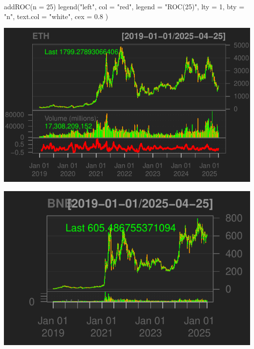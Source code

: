 \documentclass[]{tufte-handout}
\newenvironment{Shaded}{}{}
\newcommand{\AttributeTok}[1]{\textcolor[rgb]{0.49,0.56,0.16}{#1}}
\newcommand{\DecValTok}[1]{\textcolor[rgb]{0.25,0.63,0.44}{#1}}
\newcommand{\FloatTok}[1]{\textcolor[rgb]{0.25,0.63,0.44}{#1}}
\newcommand{\FunctionTok}[1]{\textcolor[rgb]{0.02,0.16,0.49}{#1}}
\newcommand{\NormalTok}[1]{#1}
\newcommand{\OtherTok}[1]{\textcolor[rgb]{0.00,0.44,0.13}{#1}}
\newcommand{\SpecialCharTok}[1]{\textcolor[rgb]{0.25,0.44,0.63}{#1}}
\newcommand{\StringTok}[1]{\textcolor[rgb]{0.25,0.44,0.63}{#1}}
\begin{document}
\begin{Shaded}
\begin{Highlighting}[]
\FunctionTok{addROC}\NormalTok{(}\AttributeTok{n =} \DecValTok{25}\NormalTok{)}
\FunctionTok{legend}\NormalTok{(}\StringTok{"left"}\NormalTok{,}
  \AttributeTok{col =} \StringTok{"red"}\NormalTok{, }\AttributeTok{legend =} \StringTok{"ROC(25)"}\NormalTok{, }\AttributeTok{lty =} \DecValTok{1}\NormalTok{, }\AttributeTok{bty =} \StringTok{"n"}\NormalTok{,}
  \AttributeTok{text.col =} \StringTok{"white"}\NormalTok{, }\AttributeTok{cex =} \FloatTok{0.8}
\NormalTok{)}
\end{Highlighting}
\end{Shaded}

\includegraphics{cripto_update_files/figure-latex/unnamed-chunk-12-4}

\begin{Shaded}
\end{Shaded}

\includegraphics{cripto_update_files/figure-latex/unnamed-chunk-12-5}
\end{document}
